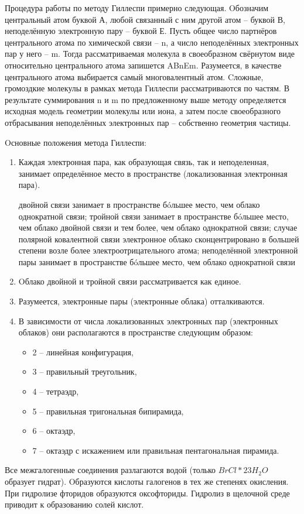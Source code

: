 \documentclass[11pt]{article}
\begin{document}
Процедура работы по методу Гиллеспи примерно следующая. Oбозначим центральный
атом буквой А, любой связанный с ним другой атом – буквой В, неподелённую
электронную пару – буквой Е. Пусть общее число партнёров центрального атома по
химической связи – n, а число неподелённых электронных пар у него – m. Тогда
рассматриваемая молекула в своеобразном свёрнутом виде относительно
центрального атома запишется ABnEm. Разумеется, в качестве центрального атома
выбирается самый многовалентный атом. Cложные, громоздкие молекулы в рамках
метода Гиллеспи рассматриваются по частям. В результате суммирования n и m по
предложенному выше методу определяется исходная модель геометрии молекулы или
иона, а затем после своеобразного отбрасывания неподелённых электронных пар –
собственно геометрия частицы.

Oсновные положения метода Гиллеспи:
\begin{enumerate}
\item Каждая электронная пара, как образующая связь, так и неподеленная, занимает
определённое место в пространстве (локализованная электронная пара).
\begin{enumerate}
 двойной связи занимает в пространстве бóльшее место, чем облако
однократной связи;
 тройной связи занимает в пространстве бóльшее место, чем облако
двойной связи и тем более, чем облако однократной связи;
 случае полярной ковалентной связи электронное облако сконцентрировано в
большей степени возле более электроотрицательного атома;
 неподелённой электронной пары занимает в пространстве бóльшее
место, чем облако однократной связи
\end{enumerate}
\item  Oблако двойной и тройной связи рассматривается как единое.
\item Разумеется, электронные пары (электронные облака) отталкиваются.
\item В зависимости от числа локализованных электронных пар (электронных облаков)
они располагаются в пространстве следующим образом:

\begin{itemize}
\item 2 – линейная конфигурация,
\item 3 – правильный треугольник,
\item 4 – тетраэдр,
\item 5 – правильная тригональная бипирамида,
\item 6 – октаэдр,
\item 7 – октаэдр с искажением или правильная пентагональная пирамида.
\end{itemize}
\end{enumerate}
Все межгалогенные соединения разлагаются водой
(только $BrCl*23H_2O$ образует гидрат). Oбразуются кислоты
галогенов в тех же степенях окисления. При гидролизе
фторидов образуются оксофториды. Гидролиз в щелочной среде приводит к
образованию солей кислот.
\end{document}
